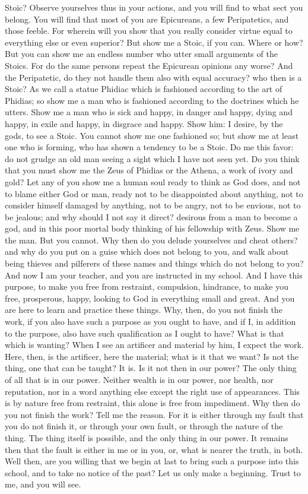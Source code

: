 \documentclass[a4paper]{article}
\begin{document}
Stoic?
    Observe yourselves thus in your actions, and you will find to what sect you
belong. You will find that most of you are Epicureans, a few Peripatetics, and
those feeble. For wherein will you show that you really consider virtue equal
to everything else or even superior? But show me a Stoic, if you can. Where or
how? But you can show me an endless number who utter small arguments of the
Stoics. For do the same persons repeat the Epicurean opinions any worse? And
the Peripatetic, do they not handle them also with equal accuracy? who then is
a Stoic? As we call a statue Phidiac which is fashioned according to the art of
Phidias; so show me a man who is fashioned according to the doctrines which he
utters. Show me a man who is sick and happy, in danger and happy, dying and
happy, in exile and happy, in disgrace and happy. Show him: I desire, by the
gods, to see a Stoic. You cannot show me one fashioned so; but show me at least
one who is forming, who has shown a tendency to be a Stoic. Do me this favor:
do not grudge an old man seeing a sight which I have not seen yet. Do you think
that you must show me the Zeus of Phidias or the Athena, a work of ivory and
gold? Let any of you show me a human soul ready to think as God does, and not
to blame either God or man, ready not to be disappointed about anything, not to
consider himself damaged by anything, not to be angry, not to be envious, not
to be jealous; and why should I not say it direct? desirous from a man to
become a god, and in this poor mortal body thinking of his fellowship with
Zeus. Show me the man. But you cannot. Why then do you delude yourselves and
cheat others? and why do you put on a guise which does not belong to you, and
walk about being thieves and pilferers of these names and things which do not
belong to you?
    And now I am your teacher, and you are instructed in my school. And I have
this purpose, to make you free from restraint, compulsion, hindrance, to make
you free, prosperous, happy, looking to God in everything small and great. And
you are here to learn and practice these things. Why, then, do you not finish
the work, if you also have such a purpose as you ought to have, and if I, in
addition to the purpose, also have such qualification as I ought to have? What
is that which is wanting? When I see an artificer and material by him, I expect
the work. Here, then, is the artificer, here the material; what is it that we
want? Is not the thing, one that can be taught? It is. Is it not then in our
power? The only thing of all that is in our power. Neither wealth is in our
power, nor health, nor reputation, nor in a word anything else except the right
use of appearances. This is by nature free from restraint, this alone is free
from impediment. Why then do you not finish the work? Tell me the reason. For
it is either through my fault that you do not finish it, or through your own
fault, or through the nature of the thing. The thing itself is possible, and
the only thing in our power. It remains then that the fault is either in me or
in you, or, what is nearer the truth, in both. Well then, are you willing that
we begin at last to bring such a purpose into this school, and to take no
notice of the past? Let us only make a beginning. Trust to me, and you will
see.
\end{document}
